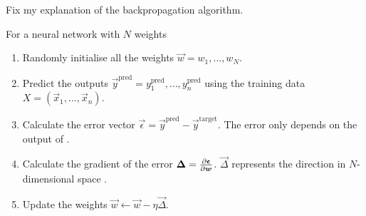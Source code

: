 \begin{todo}
	Fix my explanation of the backpropagation algorithm.

For a neural network with \(N\) weights
\begin{enumerate}
	\item Randomly initialise all the weights \(\vec{w} = w_1, \dots, w_N\).
	\item Predict the outputs \(\vec{y}^\text{pred} = y^\text{pred}_1, \dots, y^\text{pred}_n\) using the training data \(X = (\vec{x}_1, \dots, \vec{x}_n)\).
	\item Calculate the error vector \(\vec{\epsilon} = \vec{y}^\text{pred} - \vec{y}^\text{target}\). The error only depends on the output of .
	\item Calculate the gradient of the error \(\bm{\Delta} = \pdv{\bm{\epsilon}}{\bm{w}}\). \(\vec{\Delta}\) represents the direction in \(N\)-dimensional space .
	\item Update the weights \(\vec{w} \leftarrow \vec{w} - \eta \vec{\Delta}\).
\end{enumerate}
\end{todo}


